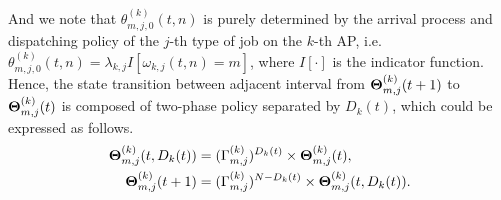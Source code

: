 \begin{definition}
    And we note that $\theta^{(k)}_{m,j,0}(t,n)$ is purely determined by the arrival process and dispatching policy of the $j$-th type of job on the $k$-th AP, i.e. $\theta^{(k)}_{m,j,0}(t,n) = \lambda_{k,j} I[\omega_{k,j}(t,n) = m]$, where $I[\cdot]$ is the indicator function.
    Hence, the state transition between adjacent interval from $\boldsymbol{\Theta}^{(k)}_{m,j}(t+1)$ to $\boldsymbol{\Theta}^{(k)}_{m,j}(t)$ is composed of two-phase policy separated by $D_k(t)$, which could be expressed as follows.
    \begin{align}
        \boldsymbol{\Theta}^{(k)}_{m,j}(t, D_{k}(t)) &= (\Gamma^{(k)}_{m,j})^{D_{k}(t)} \times \boldsymbol{\Theta}^{(k)}_{m,j}(t),
        \nonumber\\
        \boldsymbol{\Theta}^{(k)}_{m,j}(t+1) &= (\Gamma^{(k)}_{m,j})^{N-D_{k}(t)} \times \boldsymbol{\Theta}^{(k)}_{m,j}(t, D_{k}(t)).
    \end{align}
\end{definition}

